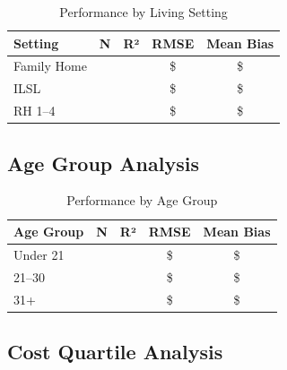 \begin{table}[h]
\centering
\caption{Performance by Living Setting}
\begin{tabular}{lcccc}
\toprule
\textbf{Setting} & \textbf{N} & \textbf{R²} & \textbf{RMSE} & \textbf{Mean Bias} \\
\midrule
Family Home & \ModelEightSubgrouplivingFHN{} & \ModelEightSubgrouplivingFHRSquared{} & \$\ModelEightSubgrouplivingFHRMSE{} & \$\ModelEightSubgrouplivingFHBias{} \\
ILSL & \ModelEightSubgrouplivingILSLN{} & \ModelEightSubgrouplivingILSLRSquared{} & \$\ModelEightSubgrouplivingILSLRMSE{} & \$\ModelEightSubgrouplivingILSLBias{} \\
RH 1--4 & \ModelEightSubgrouplivingRHOneToFourN{} & \ModelEightSubgrouplivingRHOneToFourRSquared{} & \$\ModelEightSubgrouplivingRHOneToFourRMSE{} & \$\ModelEightSubgrouplivingRHOneToFourBias{} \\
\bottomrule
\end{tabular}
\end{table}

\subsection{Age Group Analysis}

\begin{table}[h]
\centering
\caption{Performance by Age Group}
\begin{tabular}{lcccc}
\toprule
\textbf{Age Group} & \textbf{N} & \textbf{R²} & \textbf{RMSE} & \textbf{Mean Bias} \\
\midrule
Under 21 & \ModelEightSubgroupageAgeUnderTwentyOneN{} & \ModelEightSubgroupageAgeUnderTwentyOneRSquared{} & \$\ModelEightSubgroupageAgeUnderTwentyOneRMSE{} & \$\ModelEightSubgroupageAgeUnderTwentyOneBias{} \\
21--30 & \ModelEightSubgroupageAgeTwentyOneToThirtyN{} & \ModelEightSubgroupageAgeTwentyOneToThirtyRSquared{} & \$\ModelEightSubgroupageAgeTwentyOneToThirtyRMSE{} & \$\ModelEightSubgroupageAgeTwentyOneToThirtyBias{} \\
31+ & \ModelEightSubgroupageAgeThirtyOnePlusN{} & \ModelEightSubgroupageAgeThirtyOnePlusRSquared{} & \$\ModelEightSubgroupageAgeThirtyOnePlusRMSE{} & \$\ModelEightSubgroupageAgeThirtyOnePlusBias{} \\
\bottomrule
\end{tabular}
\end{table}

\subsection{Cost Quartile Analysis}

